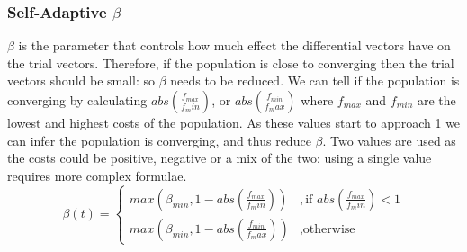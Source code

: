 \subsubsection{Self-Adaptive $\beta$}
$\beta$ is the parameter that controls how much effect the differential vectors have on the trial vectors. Therefore, if the population is close to converging then the trial vectors should be small: so $\beta$ needs to be reduced. We can tell if the population is converging by calculating $abs(\frac{f_{max}}{f_min})$, or  $abs(\frac{f_{min}}{f_max})$ where $f_{max}$ and $f_{min}$ are the lowest and highest costs of the population. As these values start to approach 1 we can infer the population is converging, and thus reduce $\beta$. Two values are used as the costs could be positive, negative or a mix of the two: using a single value requires more complex formulae.
\begin{equation}
    \beta(t) = 
    \begin{cases}
        max(\beta_{min}, 1- abs(\frac{f_{max}}{f_min})) &, \text{if } abs(\frac{f_{max}}{f_min}) < 1 \\
        max(\beta_{min}, 1- abs(\frac{f_{min}}{f_max})) &, \text{otherwise}   
    \end{cases}
\end{equation}


